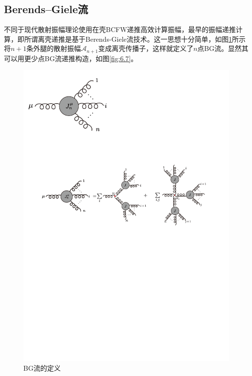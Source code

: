 \subsection{Berends–Giele流}
不同于现代散射振幅理论使用在壳BCFW递推高效计算振幅，最早的振幅递推计算，即所谓离壳递推是基于Berends-Giele流技术\cite{Berends:1987me}。这一思想十分简单，如图\ref{fig:6.6}所示将$n+1$条外腿的散射振幅$\mathcal{A}_{n+1}$变成离壳传播子，这样就定义了$n$点BG流。显然其可以用更少点BG流递推构造，如图\ref{fig:6.7}。
\begin{figure}[htbp]
	\centering
	\includegraphics[width=.5\linewidth]{figs/fig13.pdf}
	\caption{BG流的定义}
	\label{fig:6.6}
\end{figure}
